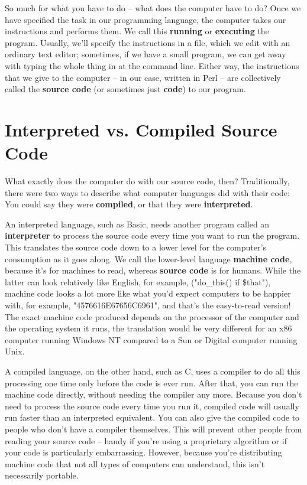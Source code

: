 \documentclass[a4paper,11pt]{book}
\begin{document}
\noindent So much for what you have to do -- what does the computer have to do? Once we have specified the task in our programming language, the computer takes our instructions and performs them. We call this \textbf{running }or \textbf{executing }the program. Usually, we'll specify the instructions in a file, which we edit with an ordinary text editor; sometimes, if we have a small program, we can get away with typing the whole thing in at the command line. Either way, the instructions that we give to the computer -- in our case, written in Perl -- are collectively called the \textbf{source code }(or sometimes just \textbf{code}) to our program.

\section{Interpreted vs. Compiled Source Code}

\noindent What exactly does the computer do with our source code, then? Traditionally, there were two ways to describe what computer languages did with their code: You could say they were \textbf{compiled}, or that they were \textbf{interpreted}.

\noindent 

\noindent An interpreted language, such as Basic, needs another program called an \textbf{interpreter }to process the source code every time you want to run the program. This translates the source code down to a lower level for the computer's consumption as it goes along. We call the lower-level language \textbf{machine code}, because it's for machines to read, whereas \textbf{source code }is for humans. While the latter can look relatively like English, for example,  ("do\_this() if \$that"), machine code looks a lot more like what you'd expect computers to be happier with, for example, "4576616E67656C6961", and that's the easy-to-read version! The exact machine code produced depends on the processor of the computer and the operating system it runs, the translation would be very different for an x86 computer running Windows NT compared to a Sun or Digital computer running Unix.

\noindent A compiled language, on the other hand, such as C, uses a compiler to do all this processing one time only before the code is ever run. After that, you can run the machine code directly, without needing the compiler any more. Because you don't need to process the source code every time you run it, compiled code will usually run faster than an interpreted equivalent. You can also give the compiled code to people who don't have a compiler themselves. This will prevent other people from reading your source code -- handy if you're using a proprietary algorithm or if your code is particularly embarrassing. However, because you're distributing machine code that not all types of computers can understand, this isn't necessarily portable.
\end{document}
